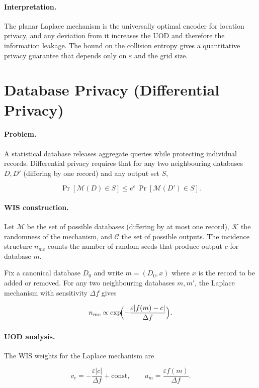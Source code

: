 \paragraph{Interpretation.}
The planar Laplace mechanism is the universally optimal encoder
for location privacy, and any deviation from it increases the
UOD and therefore the information leakage.  The bound on the
collision entropy gives a quantitative privacy guarantee that
depends only on $\varepsilon$ and the grid size.

\section{Database Privacy (Differential Privacy)}\label{ch:sec:database-privacy-differential-privacy}
\label{sec:app-dp}

\paragraph{Problem.}
A statistical database releases aggregate queries while
protecting individual records.  Differential privacy \cite{dwork2006differential} requires that for any two neighbouring
databases $D,D'$ (differing by one record) and any output set $S$,

\[
\Pr[\mathcal M(D)\in S] \le e^\varepsilon\,\Pr[\mathcal M(D')\in S].
\]

\paragraph{WIS construction.}
Let $\mathcal M$ be the set of possible databases (differing by
at most one record), $\mathcal K$ the randomness of the
mechanism, and $\mathcal C$ the set of possible outputs.  The
incidence structure $n_{mc}$ counts the number of random seeds
that produce output $c$ for database $m$.

Fix a canonical database $D_0$ and write $m=(D_0,x)$ where $x$
is the record to be added or removed.  For any two neighbouring
databases $m,m'$, the Laplace mechanism with sensitivity
$\Delta f$ gives

\[
n_{mc} \propto \exp\!\Bigl(-\frac{\varepsilon|f(m)-c|}{\Delta f}\Bigr).
\]

\paragraph{UOD analysis.}
The WIS weights for the Laplace mechanism are

\[
v_c = -\frac{\varepsilon|c|}{\Delta f} + \text{const},\qquad
u_m = \frac{\varepsilon f(m)}{\Delta f}.
\]

